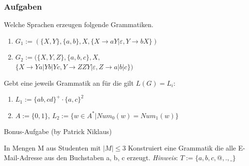 \begin{frame}
  \frametitle{Aufgaben}
  \begin{exampleblock}{Welche Sprachen erzeugen folgende Grammatiken.}
    \begin{enumerate}
      \item $G_1 := (\{X, Y\}, \{a, b\}, X, \{X \rightarrow aY | \varepsilon, Y \rightarrow bX\})$
      \item $G_2 := (\{X, Y, Z\}, \{a, b, c\}, X,$\\
             $\{X \rightarrow Ya | Yb | Yc, Y \rightarrow ZZY | \varepsilon, Z \rightarrow a | b | c\})$
    \end{enumerate}
  \end{exampleblock}
  \begin{exampleblock}{Gebt eine jeweils Grammatik an für die gilt $L(G) = L_i$:}
        \begin{enumerate}
      \item $L_1 := \{ab, cd\}^+ \cdot \{a, c\}^2$
      \item $A := \{0, 1\}$, $L_2 := \{w  \in A^*| Num_0(w) = Num_1(w)\}$
    \end{enumerate}
  \end{exampleblock}
\end{frame}

\begin{frame}{Bonus-Aufgabe (by Patrick Niklaus)}
  \begin{exampleblock}{In Mengen M aus Studenten mit $|M| \leq 3$}
    Konstruiert eine Grammatik die alle E-Mail-Adresse aus den Buchstaben {a, b, c} erzeugt.
    \emph{Hinweis}: $T := \{a, b, c, @, ., \_\}$
  \end{exampleblock}\pause
\end{frame}

